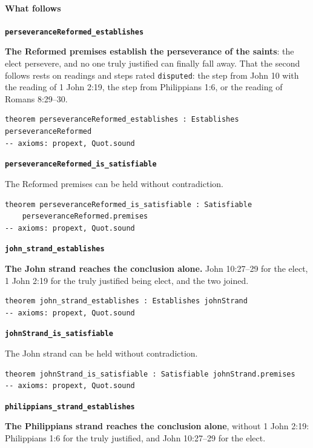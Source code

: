 \documentclass[11pt]{article}
\begin{document}
\paragraph*{What follows}
\leavevmode\par\nobreak
\par\medskip\noindent\textbf{\texttt{perseverance\allowbreak{}Reformed\_\allowbreak{}establishes}}\par\nobreak\noindent
\textbf{The Reformed premises establish the perseverance of the saints}: the elect persevere, and no one truly justified can finally fall away. That the second follows rests on readings and steps rated \texttt{disputed}: the step from John 10 with the reading of 1 John 2:19, the step from Philippians 1:6, or the reading of Romans 8:29–30.

{\small\begin{verbatim}
theorem perseveranceReformed_establishes : Establishes perseveranceReformed
-- axioms: propext, Quot.sound
\end{verbatim}}
\par\medskip\noindent\textbf{\texttt{perseverance\allowbreak{}Reformed\_\allowbreak{}is\_\allowbreak{}satisfiable}}\par\nobreak\noindent
The Reformed premises can be held without contradiction.

{\small\begin{verbatim}
theorem perseveranceReformed_is_satisfiable : Satisfiable
    perseveranceReformed.premises
-- axioms: propext, Quot.sound
\end{verbatim}}
\par\medskip\noindent\textbf{\texttt{john\_\allowbreak{}strand\_\allowbreak{}establishes}}\par\nobreak\noindent
\textbf{The John strand reaches the conclusion alone.} John 10:27–29 for the elect, 1 John 2:19 for the truly justified being elect, and the two joined.

{\small\begin{verbatim}
theorem john_strand_establishes : Establishes johnStrand
-- axioms: propext, Quot.sound
\end{verbatim}}
\par\medskip\noindent\textbf{\texttt{john\allowbreak{}Strand\_\allowbreak{}is\_\allowbreak{}satisfiable}}\par\nobreak\noindent
The John strand can be held without contradiction.

{\small\begin{verbatim}
theorem johnStrand_is_satisfiable : Satisfiable johnStrand.premises
-- axioms: propext, Quot.sound
\end{verbatim}}
\par\medskip\noindent\textbf{\texttt{philippians\_\allowbreak{}strand\_\allowbreak{}establishes}}\par\nobreak\noindent
\textbf{The Philippians strand reaches the conclusion alone}, without 1 John 2:19: Philippians 1:6 for the truly justified, and John 10:27–29 for the elect.
\end{document}
